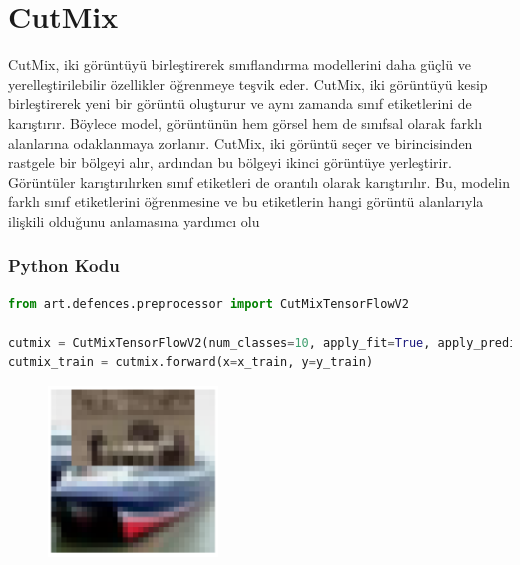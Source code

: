 \section{CutMix}

CutMix, iki görüntüyü birleştirerek sınıflandırma modellerini daha güçlü ve yerelleştirilebilir özellikler öğrenmeye teşvik eder. CutMix, iki görüntüyü kesip birleştirerek yeni bir görüntü oluşturur ve aynı zamanda sınıf etiketlerini de karıştırır. Böylece model, görüntünün hem görsel hem de sınıfsal olarak farklı alanlarına odaklanmaya zorlanır. CutMix, iki görüntü seçer ve birincisinden rastgele bir bölgeyi alır, ardından bu bölgeyi ikinci görüntüye yerleştirir. Görüntüler karıştırılırken sınıf etiketleri de orantılı olarak karıştırılır. Bu, modelin farklı sınıf etiketlerini öğrenmesine ve bu etiketlerin hangi görüntü alanlarıyla ilişkili olduğunu anlamasına yardımcı olu

\subsubsection{Python Kodu}

\begin{lstlisting}[language=Python]
from art.defences.preprocessor import CutMixTensorFlowV2

cutmix = CutMixTensorFlowV2(num_classes=10, apply_fit=True, apply_predict=False)
cutmix_train = cutmix.forward(x=x_train, y=y_train)
\end{lstlisting}

\begin{figure}[h]
    \centering
    \includegraphics[width=0.4\textwidth]{images/cutmix_example.png}
    \caption{}
\end{figure}

\newpage